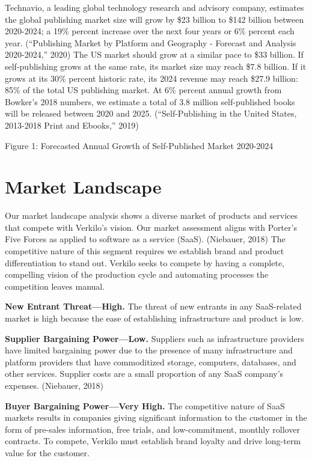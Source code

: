 \documentclass[10pt,openany]{book}
\begin{document}
Technavio, a leading global technology research and advisory company,
estimates the global publishing market size will grow by \$23 billion to
\$142 billion between 2020-2024; a 19\% percent increase over the next
four years or 6\% percent each year. (``Publishing Market by Platform
and Geography - Forecast and Analysis 2020-2024,'' 2020) The US market
should grow at a similar pace to \$33 billion. If self-publishing grows
at the same rate, its market size may reach \$7.8 billion. If it grows
at its 30\% percent historic rate, its 2024 revenue may reach \$27.9
billion: 85\% of the total US publishing market. At 6\% percent annual
growth from Bowker's 2018 numbers, we estimate a total of 3.8 million
self-published books will be released between 2020 and 2025.
(``Self-Publishing in the United States, 2013-2018 Print and Ebooks,''
2019)

Figure 1: Forecasted Annual Growth of Self-Published Market 2020-2024

\hypertarget{market-landscape}{%
\section{Market Landscape}\label{market-landscape}}

Our market landscape analysis shows a diverse market of products and
services that compete with Verkilo's vision. Our market assessment
aligns with Porter's Five Forces as applied to software as a service
(SaaS). (Niebauer, 2018) The competitive nature of this segment requires
we establish brand and product differentiation to stand out. Verkilo
seeks to compete by having a complete, compelling vision of the
production cycle and automating processes the competition leaves manual.

\textbf{New Entrant Threat---High.} The threat of new entrants in any
SaaS-related market is high because the ease of establishing
infrastructure and product is low.

\textbf{Supplier Bargaining Power---Low.} Suppliers such as
infrastructure providers have limited bargaining power due to the
presence of many infrastructure and platform providers that have
commoditized storage, computers, databases, and other services. Supplier
costs are a small proportion of any SaaS company's expenses. (Niebauer,
2018)

\textbf{Buyer Bargaining Power---Very High.} The competitive nature of
SaaS markets results in companies giving significant information to the
customer in the form of pre-sales information, free trials, and
low-commitment, monthly rollover contracts. To compete, Verkilo must
establish brand loyalty and drive long-term value for the customer.
\end{document}
